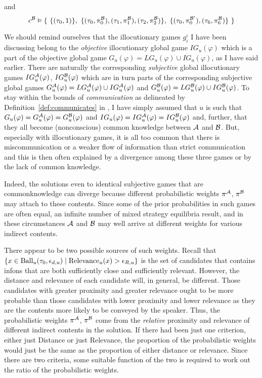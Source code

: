 \noindent and
\[c^{\cal B} \vDash \{\ \{(\tau_0, 1)\},\ \{(\tau_0, \pi^{\cal B}_0), (\tau_1, \pi^{\cal B}_1), (\tau_2, \pi^{\cal B}_2)\},\ \{(\tau_0, \pi^{{\cal B}'}_0), (\tau_6, \pi^{\cal B}_6)\}\ \}\]

We should remind ourselves that the illocutionary games $g^\iota_i$ I have been discussing belong to the \emph{objective} illocutionary global game $IG_u(\varphi)$ which is a part of the objective global game $G_u(\varphi) = LG_u(\varphi) \cup IG_u(\varphi)$, as I have said earlier. There are naturally the corresponding \emph{subjective} global illocutionary games $IG^{\cal A}_u(\varphi)$, $IG^{\cal B}_u(\varphi)$ which are in turn parts of the corresponding subjective global games $G^{\cal A}_u(\varphi) = LG^{\cal A}_u(\varphi) \cup IG^{\cal A}_u(\varphi)$ and $G^{\cal B}_u(\varphi) = LG^{\cal B}_u(\varphi) \cup IG^{\cal B}_u(\varphi)$. To stay within the bounds of \emph{communication} as delineated by Definition~\ref{def:communicates} in , I have simply assumed that $u$ is such that $G_u(\varphi) = G^{\cal A}_u(\varphi) = G^{\cal B}_u(\varphi)$ and $IG_u(\varphi) = IG^{\cal A}_u(\varphi) = IG^{\cal B}_u(\varphi)$ and, further, that 
they all become (nonconscious) common knowledge between $\cal A$ and $\cal B$. But, especially with illocutionary games, it is all too common that there is miscommunication or a weaker flow of information than strict communication and this is then often explained by a divergence among these three games or by the lack of common knowledge. 

Indeed, the solutions even to identical subjective games that are common\linebreak knowledge can diverge because different probabilistic weights $\pi^{\cal A}$, $\pi^{\cal B}$ may attach to these contents. Since some of the prior probabilities in such games are often equal, an infinite number of mixed strategy equilibria result, and in these circumstances $\cal A$ and $\cal B$ may well arrive at different weights for various indirect contents.

There appear to be two possible sources of such weights. Recall that $\{ x \in \hbox{Ball}_u(\tau_0, \epsilon_{d,u}) \mid  \hbox{Relevance}_u(x) > \epsilon_{R,u} \}$ is the set of candidates that contains infons that are both sufficiently close and sufficiently relevant. However, the distance and relevance of each candidate will, in general, be different. Those candidates with greater proximity and greater relevance ought to be more probable than those candidates with lower proximity and lower relevance as they are the contents more likely to be conveyed by the speaker. Thus, the probabilistic weights $\pi^{\cal A}$, $\pi^{\cal B}$ come from the \emph{relative} proximity and relevance of different indirect contents in the solution. If there had been just one criterion, either just Distance or just Relevance, the proportion of the probabilistic weights would just be the same as the proportion of either distance or relevance. Since there are two criteria, some suitable function of the two is required to work out the ratio of the probabilistic weights. 

